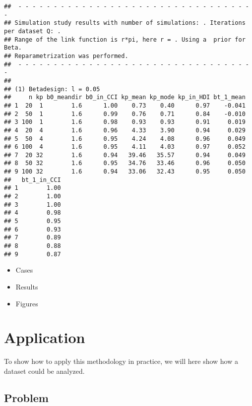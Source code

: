 \documentclass[12pt,a4paper]{article}\usepackage[]{graphicx}\usepackage[]{color}
\makeatletter
\newenvironment{kframe}{%
 \def\at@end@of@kframe{}%
 \ifinner\ifhmode%
  \def\at@end@of@kframe{\end{minipage}}%
  \begin{minipage}{\columnwidth}%
 \fi\fi%
 \def\FrameCommand##1{\hskip\@totalleftmargin \hskip-\fboxsep
 \colorbox{shadecolor}{##1}\hskip-\fboxsep
     \hskip-\linewidth \hskip-\@totalleftmargin \hskip\columnwidth}%
 \MakeFramed {\advance\hsize-\width
   \@totalleftmargin\z@ \linewidth\hsize
   \@setminipage}}%
 {\par\unskip\endMakeFramed%
 \at@end@of@kframe}
\newenvironment{knitrout}{}{} %
\makeatother
\begin{document}
\begin{knitrout}
\color{fgcolor}\begin{kframe}
\begin{verbatim}
##  - - - - - - - - - - - - - - - - - - - - - - - - - - - - - - - - - - 
## Simulation study results with number of simulations: . Iterations per dataset Q: .
## Range of the link function is r*pi, here r = . Using a  prior for Beta.
## Reparametrization was performed.
##  - - - - - - - - - - - - - - - - - - - - - - - - - - - - - - - - - - 
## 
## (1) Betadesign: l = 0.05
##     n kp b0_meandir b0_in_CCI kp_mean kp_mode kp_in_HDI bt_1_mean
## 1  20  1        1.6      1.00    0.73    0.40      0.97    -0.041
## 2  50  1        1.6      0.99    0.76    0.71      0.84    -0.010
## 3 100  1        1.6      0.98    0.93    0.93      0.91     0.019
## 4  20  4        1.6      0.96    4.33    3.90      0.94     0.029
## 5  50  4        1.6      0.95    4.24    4.08      0.96     0.049
## 6 100  4        1.6      0.95    4.11    4.03      0.97     0.052
## 7  20 32        1.6      0.94   39.46   35.57      0.94     0.049
## 8  50 32        1.6      0.95   34.76   33.46      0.96     0.050
## 9 100 32        1.6      0.94   33.06   32.43      0.95     0.050
##   bt_1_in_CCI
## 1        1.00
## 2        1.00
## 3        1.00
## 4        0.98
## 5        0.95
## 6        0.93
## 7        0.89
## 8        0.88
## 9        0.87
\end{verbatim}
\end{kframe}
\end{knitrout}




\begin{itemize}
\item Cases
\item Results
\item Figures
\end{itemize}

\section{Application}

To show how to apply this methodology in practice, we will here show how a dataset could be analyzed.

\subsection{Problem}
\end{document}
